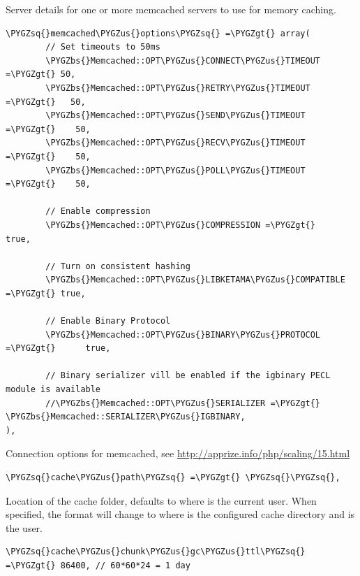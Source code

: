 \documentclass[letterpaper,10pt,english]{sphinxmanual}
\def\PYGZbs{\char`\\}
\def\PYGZus{\char`\_}
\def\PYGZgt{\char`\>}
\def\PYGZsq{\char`\'}
\begin{document}
Server details for one or more memcached servers to use for memory caching.

\begin{Verbatim}[commandchars=\\\{\}]
\PYGZsq{}memcached\PYGZus{}options\PYGZsq{} =\PYGZgt{} array(
        // Set timeouts to 50ms
        \PYGZbs{}Memcached::OPT\PYGZus{}CONNECT\PYGZus{}TIMEOUT =\PYGZgt{} 50,
        \PYGZbs{}Memcached::OPT\PYGZus{}RETRY\PYGZus{}TIMEOUT =\PYGZgt{}   50,
        \PYGZbs{}Memcached::OPT\PYGZus{}SEND\PYGZus{}TIMEOUT =\PYGZgt{}    50,
        \PYGZbs{}Memcached::OPT\PYGZus{}RECV\PYGZus{}TIMEOUT =\PYGZgt{}    50,
        \PYGZbs{}Memcached::OPT\PYGZus{}POLL\PYGZus{}TIMEOUT =\PYGZgt{}    50,

        // Enable compression
        \PYGZbs{}Memcached::OPT\PYGZus{}COMPRESSION =\PYGZgt{}          true,

        // Turn on consistent hashing
        \PYGZbs{}Memcached::OPT\PYGZus{}LIBKETAMA\PYGZus{}COMPATIBLE =\PYGZgt{} true,

        // Enable Binary Protocol
        \PYGZbs{}Memcached::OPT\PYGZus{}BINARY\PYGZus{}PROTOCOL =\PYGZgt{}      true,

        // Binary serializer vill be enabled if the igbinary PECL module is available
        //\PYGZbs{}Memcached::OPT\PYGZus{}SERIALIZER =\PYGZgt{} \PYGZbs{}Memcached::SERIALIZER\PYGZus{}IGBINARY,
),
\end{Verbatim}

Connection options for memcached, see \href{http://apprize.info/php/scaling/15.html}{http://apprize.info/php/scaling/15.html}

\begin{Verbatim}[commandchars=\\\{\}]
\PYGZsq{}cache\PYGZus{}path\PYGZsq{} =\PYGZgt{} \PYGZsq{}\PYGZsq{},
\end{Verbatim}

Location of the cache folder, defaults to  where
 is the current user. When specified, the format will change to
 where  is the configured cache directory
and  is the user.

\begin{Verbatim}[commandchars=\\\{\}]
\PYGZsq{}cache\PYGZus{}chunk\PYGZus{}gc\PYGZus{}ttl\PYGZsq{} =\PYGZgt{} 86400, // 60*60*24 = 1 day
\end{Verbatim}
\end{document}
